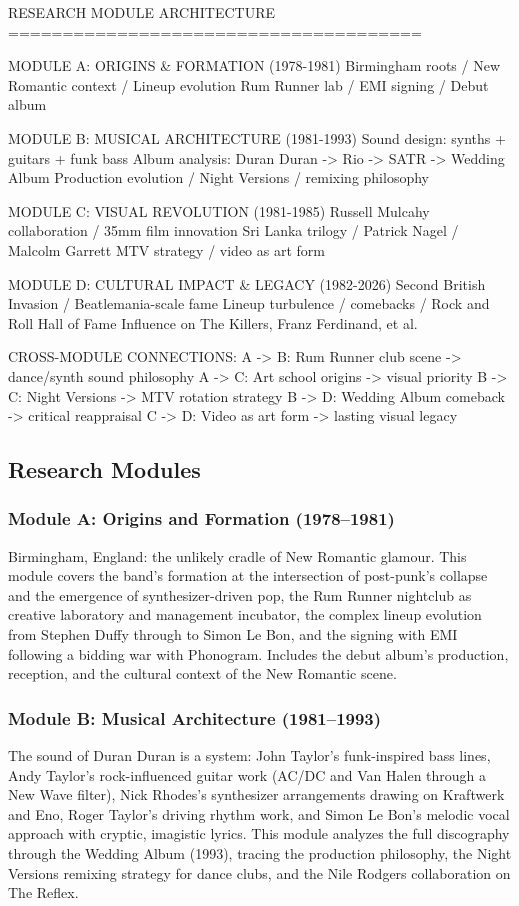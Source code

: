 \documentclass[11pt,letterpaper]{article}
\begin{document}
\begin{asciibox}
RESEARCH MODULE ARCHITECTURE
======================================

MODULE A: ORIGINS & FORMATION (1978-1981)
  Birmingham roots / New Romantic context / Lineup evolution
  Rum Runner lab / EMI signing / Debut album

MODULE B: MUSICAL ARCHITECTURE (1981-1993)
  Sound design: synths + guitars + funk bass
  Album analysis: Duran Duran -> Rio -> SATR -> Wedding Album
  Production evolution / Night Versions / remixing philosophy

MODULE C: VISUAL REVOLUTION (1981-1985)
  Russell Mulcahy collaboration / 35mm film innovation
  Sri Lanka trilogy / Patrick Nagel / Malcolm Garrett
  MTV strategy / video as art form

MODULE D: CULTURAL IMPACT & LEGACY (1982-2026)
  Second British Invasion / Beatlemania-scale fame
  Lineup turbulence / comebacks / Rock and Roll Hall of Fame
  Influence on The Killers, Franz Ferdinand, et al.

CROSS-MODULE CONNECTIONS:
  A -> B: Rum Runner club scene -> dance/synth sound philosophy
  A -> C: Art school origins -> visual priority
  B -> C: Night Versions -> MTV rotation strategy
  B -> D: Wedding Album comeback -> critical reappraisal
  C -> D: Video as art form -> lasting visual legacy
\end{asciibox}

\subsection{Research Modules}

\subsubsection{Module A: Origins and Formation (1978--1981)}
Birmingham, England: the unlikely cradle of New Romantic glamour. This module covers the band's formation at the intersection of post-punk's collapse and the emergence of synthesizer-driven pop, the Rum Runner nightclub as creative laboratory and management incubator, the complex lineup evolution from Stephen Duffy through to Simon Le Bon, and the signing with EMI following a bidding war with Phonogram. Includes the debut album's production, reception, and the cultural context of the New Romantic scene.

\subsubsection{Module B: Musical Architecture (1981--1993)}
The sound of Duran Duran is a system: John Taylor's funk-inspired bass lines, Andy Taylor's rock-influenced guitar work (AC/DC and Van Halen through a New Wave filter), Nick Rhodes's synthesizer arrangements drawing on Kraftwerk and Eno, Roger Taylor's driving rhythm work, and Simon Le Bon's melodic vocal approach with cryptic, imagistic lyrics. This module analyzes the full discography through the Wedding Album (1993), tracing the production philosophy, the Night Versions remixing strategy for dance clubs, and the Nile Rodgers collaboration on The Reflex.
\end{document}
